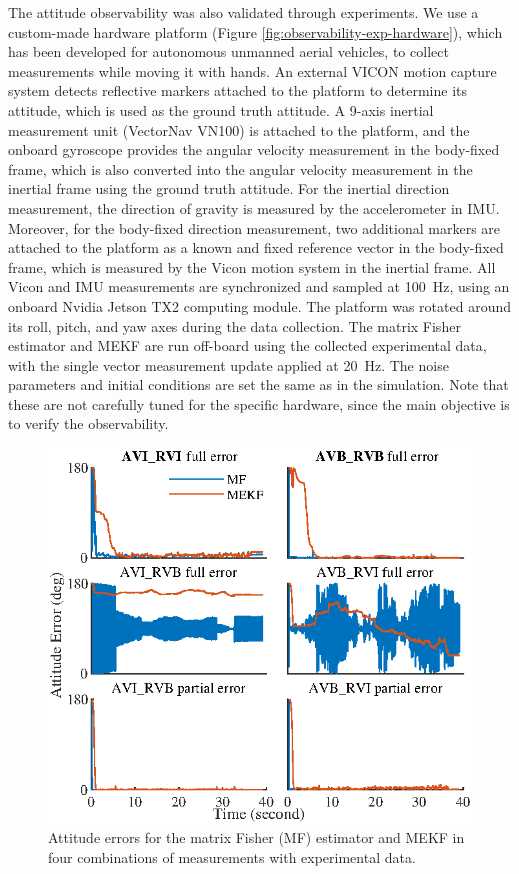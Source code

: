 The attitude observability was also validated through experiments.
We use a custom-made hardware platform (Figure \ref{fig:observability-exp-hardware}), which has been developed for autonomous unmanned aerial vehicles, to collect measurements while moving it with hands.
An external VICON motion capture system detects reflective markers attached to the platform to determine its attitude, which is used as the ground truth attitude.
A 9-axis inertial measurement unit (VectorNav VN100) is attached to the platform, and the onboard gyroscope provides the angular velocity measurement in the body-fixed frame, which is also converted into the angular velocity measurement in the inertial frame using the ground truth attitude. 
For the inertial direction measurement, the direction of gravity is measured by the accelerometer in IMU.
Moreover, for the body-fixed direction measurement, two additional markers are attached to the platform as a known and fixed reference vector in the body-fixed frame, which is measured by the Vicon motion system in the inertial frame.
All Vicon and IMU measurements are synchronized and sampled at \SI{100}{\hertz}, using an onboard Nvidia Jetson TX2 computing module.
The platform was rotated around its roll, pitch, and yaw axes during the data collection.
The matrix Fisher estimator and MEKF are run off-board using the collected experimental data, with the single vector measurement update applied at \SI{20}{\hertz}.
The noise parameters and initial conditions are set the same as in the simulation.
Note that these are not carefully tuned for the specific hardware, since the main objective is to verify the observability.

\begin{figure}
	\centering
	\includegraphics[scale=1.4]{figures/observability/attitudeError-Exp}
	\caption{Attitude errors for the matrix Fisher (MF) estimator and MEKF in four combinations of measurements with experimental data. \label{fig:observability-attitudeError-Exp}}
\end{figure}

